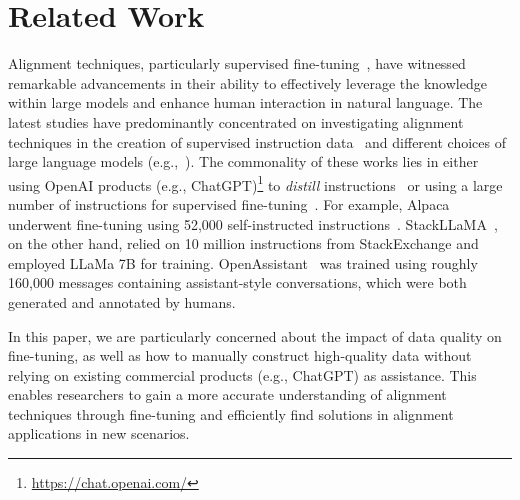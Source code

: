 \section{Related Work}

Alignment techniques, particularly supervised fine-tuning~\citep{askell2021general,ouyang2022training}, have witnessed remarkable advancements in their ability to effectively leverage the knowledge within large models and enhance human interaction in natural language. The latest studies have predominantly concentrated on investigating alignment techniques in the creation of supervised instruction data~\citep{honovich2022unnatural} and different choices of large language models (e.g.,~\citep{touvron2023llama}). %
The commonality of these works lies in either using OpenAI products (e.g., ChatGPT)\footnote{\url{https://chat.openai.com/}} to \emph{distill} instructions~\citep{alpaca,vicuna2023} or using a large number of instructions for supervised fine-tuning~\citep{beeching2023stackllama,sun2023principledriven,openassistant}.
For example, Alpaca~\citep{alpaca} underwent fine-tuning using 52,000 self-instructed instructions~\citep{wang2022selfinstruct}. 
StackLLaMA~\citep{beeching2023stackllama}, on the other hand, relied on 10 million instructions from StackExchange and employed LLaMa 7B for training. OpenAssistant~\citep{openassistant} was trained using roughly 160,000 messages containing assistant-style conversations, which were both generated and annotated by humans.




In this paper, we are particularly concerned about the impact of data quality on fine-tuning, as well as how to manually construct high-quality data without relying on existing commercial products (e.g., ChatGPT) as assistance. This enables researchers to gain a more accurate understanding of alignment techniques through fine-tuning and efficiently find solutions in alignment applications in new scenarios.


